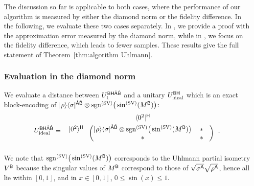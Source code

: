 The discussion so far is applicable to both cases, where the performance of our algorithm is measured by either the diamond norm or the fidelity difference.
In the following, we evaluate these two cases separately.
In , we provide a proof with the approximation error measured by the diamond norm, while in , we focus on the fidelity difference, which leads to fewer samples.
These results give the full statement of Theorem~\ref{thm:algorithm Uhlmann}.










\subsubsection{Evaluation in the diamond norm}
\label{sec:FPAA part}


We evaluate a distance between $U_1^{{\mathsf{B}}{\mathsf{H}}\hat{{\mathsf{A}}}\hat{{\mathsf{B}}}}$ and a unitary $U_{\rm ideal}^{{\mathsf{B}}{\mathsf{H}}}$ which is an exact block-encoding of $|\rho\rangle\langle\sigma|^{\hat{{\mathsf{A}}}\hat{{\mathsf{B}}}}\otimes\mathrm{sgn}^{(\rm SV)}\big(\sin^{(\rm SV)}(M^{\mathsf{B}})\big)$:
\begin{align}
    U_{\rm ideal}^{\sB\sH\hat{\sA}\hat{\sB}} 
    = \hspace{1mm}
\begin{blockarray}{ccc}
& \bra{0^2}^\sH&  \vspace{1mm}\\
\begin{block}{c(cc)}
  \ket{0^2}^\sH \hspace*{1mm} & \ketbra{\rho}{\sigma}^{\hat{\sA}\hat{\sB}}\otimes \sgn^{(\rm SV)}\big(\sin^{(\rm SV)}(M^\sB)\big) & \hspace{0mm} * \hspace{3mm}\\
  & * & \hspace{0mm} * \hspace{3mm}\\
\end{block}
\end{blockarray}\hspace{2.5mm}.
\end{align}
We note that $\mathrm{sgn}^{(\rm SV)}\big(\sin^{(\rm SV)}(M^{\mathsf{B}})\big)$ corresponds to the Uhlmann partial isometry $V^{\mathsf{B}}$ because the singular values of $M^{\mathsf{B}}$ correspond to those of $\sqrt{\sigma^{\mathsf{A}}}\sqrt{\rho^{\mathsf{A}}}$, hence all lie within $[0, 1]$, and in $x \in [0, 1]$, $0 \leq \sin(x) \leq 1$. 

